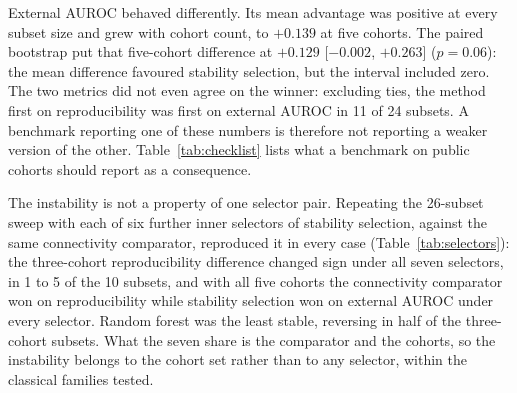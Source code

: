 \documentclass[unnumsec,webpdf,contemporary,large,numbered]{oup-authoring-template}
\begin{document}
External AUROC behaved differently. Its mean advantage was positive at every subset size and
grew with cohort count, to $+0.139$ at five cohorts. The paired bootstrap put that five-cohort
difference at $+0.129$ [$-0.002$, $+0.263$] ($p = 0.06$): the mean difference favoured
stability selection, but the interval included zero. The two metrics did not
even agree on the winner: excluding ties, the method first on reproducibility was first on
external AUROC in 11 of 24 subsets. A benchmark reporting one of these numbers is therefore not
reporting a weaker version of the other. Table~\ref{tab:checklist} lists what a benchmark on
public cohorts should report as a consequence.

The instability is not a property of one selector pair. Repeating the 26-subset sweep with each
of six further inner selectors of stability selection, against the same connectivity comparator,
reproduced it in every case (Table~\ref{tab:selectors}): the three-cohort reproducibility
difference changed sign under all seven selectors, in 1 to 5 of the 10 subsets, and with all five
cohorts the connectivity comparator won on reproducibility while stability selection won on
external AUROC under every selector. Random forest was the least stable, reversing in half of the
three-cohort subsets. What the seven share is the comparator and the cohorts, so the instability
belongs to the cohort set rather than to any selector, within the classical families tested.
\end{document}
